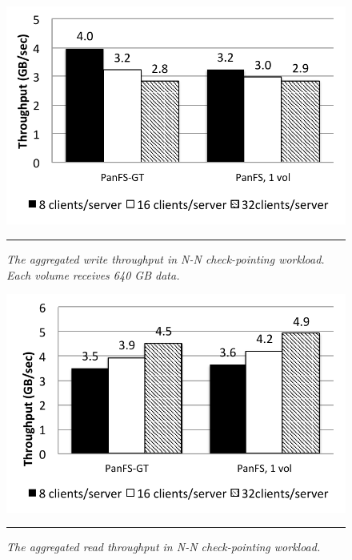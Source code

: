 \begin{figure}[t]  %
\centerline{\includegraphics[scale=0.7]{./figs/checkpointing_write}}
\vspace{10pt}
\caption{\footnotesize
\textit{
The aggregated write throughput in N-N check-pointing workload.
Each volume receives 640 GB data.
}
}
\hrule
\label{graph:checkpoint_write}
\end{figure}       %

\begin{figure}[t]  %
\centerline{\includegraphics[scale=0.7]{./figs/checkpointing_read}}
\vspace{10pt}
\caption{\footnotesize
\textit{
The aggregated read throughput in N-N check-pointing workload.
}
}
\hrule
\label{graph:checkpoint_read}
\end{figure}       %

